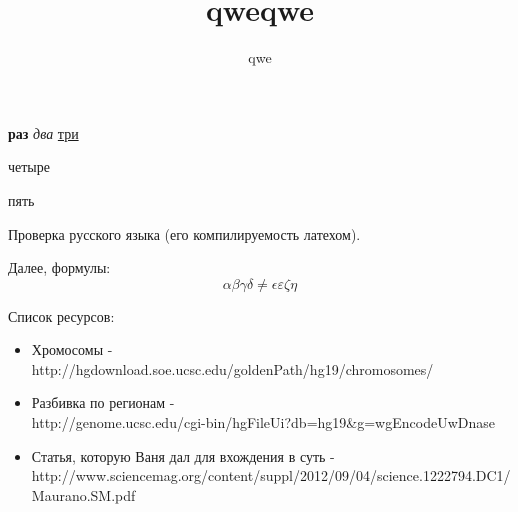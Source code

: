 \documentclass[unicode,10pt,a4paper]{article}
\author{qwe}
\title{qweqwe}
\begin{document}
\textbf{раз} \textit{два} \underline{три} \begin{center}
четыре
\end{center} \begin{flushright}
пять
\end{flushright}
Проверка русского языка (его компилируемость латехом).

Далее, формулы:
$$
\alpha\beta\gamma\delta \neq \epsilon\varepsilon\zeta\eta
$$

Список ресурсов:
\begin{itemize}
\item Хромосомы - http://hgdownload.soe.ucsc.edu/goldenPath/hg19/chromosomes/
\item Разбивка по регионам -\\ http://genome.ucsc.edu/cgi-bin/hgFileUi?db=hg19\&g=wgEncodeUwDnase
\item Статья, которую Ваня дал для вхождения в суть -\\ http://www.sciencemag.org/content/suppl/2012/09/04/science.1222794.DC1/Maurano.SM.pdf
\end{itemize}
\end{document}
